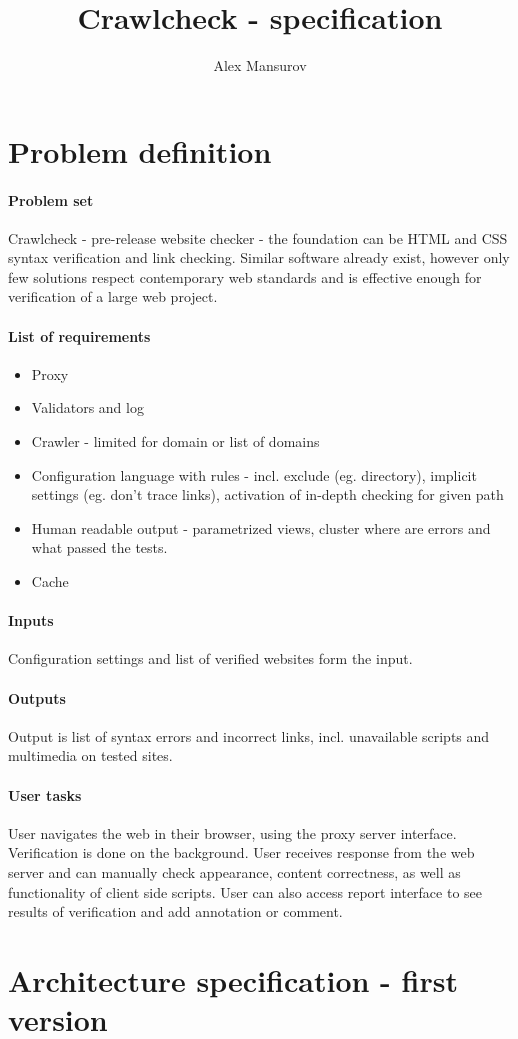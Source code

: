 \documentclass[10pt]{article}
\begin{document}
\title{Crawlcheck - specification}
\author{Alex Mansurov}
\maketitle
\newpage
\section{Problem definition}
\paragraph{Problem set}
Crawlcheck - pre-release website checker - the foundation can be HTML and CSS syntax verification and link checking. Similar software already exist, however only few solutions respect contemporary web standards and is effective enough for verification of a large web project. 
\paragraph{List of requirements}
\begin{itemize}
	\item Proxy
	\item Validators and log
	\item Crawler - limited for domain or list of domains
	\item Configuration language with rules - incl. exclude (eg. directory), implicit settings (eg. don't trace links), activation of in-depth checking for given path
	\item Human readable output - parametrized views, cluster where are errors and what passed the tests.
	\item Cache
\end{itemize}
\paragraph{Inputs} Configuration settings and list of verified websites form the input.
\paragraph{Outputs} Output is list of syntax errors and incorrect links, incl. unavailable scripts and multimedia on tested sites.
\paragraph{User tasks} User navigates the web in their browser, using the proxy server interface. Verification is done on the background. User receives response from the web server and can manually check appearance, content correctness, as well as functionality of client side scripts. User can also access report interface to see results of verification and add annotation or comment. \section{Architecture specification - first version}
\end{document}
